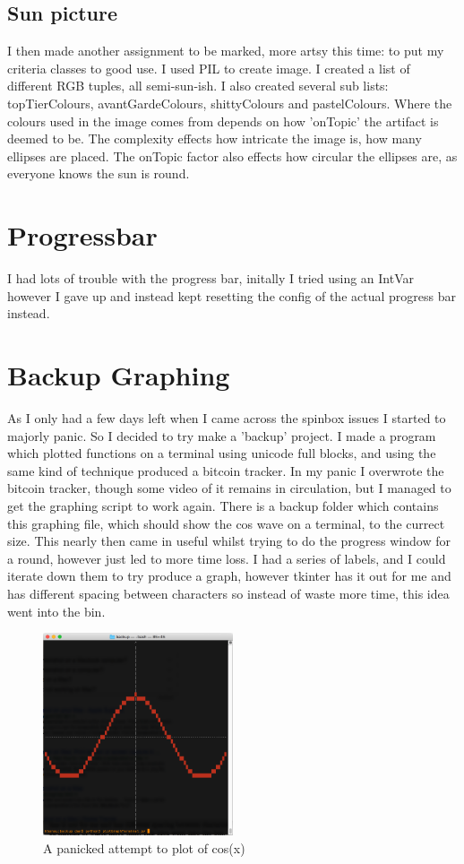 \documentclass[twocolumn]{article}   %
\begin{document}
  \subsection{Sun picture}
  I then made another assignment to be marked, more artsy this time: to put my criteria classes to good use. I used PIL to create image. I created a list of different RGB tuples, all semi-sun-ish. I also created several sub lists: topTierColours, avantGardeColours, shittyColours and pastelColours. Where the colours used in the image comes from depends on how 'onTopic' the artifact is deemed to be. The complexity effects how intricate the image is, how many ellipses are placed. The onTopic factor also effects how circular the ellipses are, as everyone knows the sun is round.

\section{Progressbar}
I had lots of trouble with the progress bar, initally I tried using an IntVar however I gave up and instead kept resetting the config of the actual progress bar instead.

\section{Backup Graphing}
As I only had a few days left when I came across the spinbox issues I started to majorly panic. So I decided to try make a 'backup' project. I made a program which plotted functions on a terminal using unicode full blocks, and using the same kind of technique produced a bitcoin tracker. In my panic I overwrote the bitcoin tracker, though some video of it remains in circulation, but I managed to get the graphing script to work again. There is a backup folder which contains this graphing file, which should show the cos wave on a terminal, to the currect size. This nearly then came in useful whilst trying to do the progress window for a round, however just led to more time loss. I had a series of labels, and I could iterate down them to try produce a graph, however tkinter has it out for me and has different spacing between characters so instead of waste more time, this idea went into the bin.

\begin{figure}
  \includegraphics[width=0.5\textwidth]{graphScreenshot}
  \caption{A panicked attempt to plot of cos(x)}
\end{figure}
\end{document}
